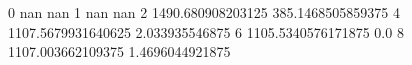 0 nan nan
1 nan nan
2 1490.680908203125 385.1468505859375
4 1107.5679931640625 2.033935546875
6 1105.5340576171875 0.0
8 1107.003662109375 1.4696044921875
